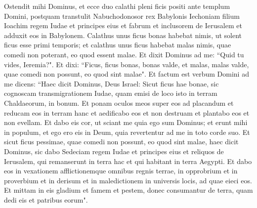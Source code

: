 \begin{biblechapter}  
\verse Ostendit mihi Dominus, et ecce duo calathi pleni ficis positi ante templum Domini, postquam transtulit Nabuchodonosor rex Babylonis Iechoniam filium Ioachim regem Iudae et principes eius et fabrum et inclusorem de Ierusalem et adduxit eos in Babylonem. 
\verse Calathus unus ficus bonas habebat nimis, ut solent ficus esse primi temporis; et calathus unus ficus habebat malas nimis, quae comedi non poterant, eo quod essent malae. 
\verse Et dixit Dominus ad me: “Quid tu vides, Ieremia?". Et dixi: “Ficus, ficus bonas, bonas valde, et malas, malas valde, quae comedi non possunt, eo quod sint malae". 
\verse Et factum est verbum Domini ad me dicens: 
\verse “Haec dicit Dominus, Deus Israel: Sicut ficus hae bonae, sic cognoscam transmigrationem Iudae, quam emisi de loco isto in terram Chaldaeorum, in bonum. 
\verse Et ponam oculos meos super eos ad placandum et reducam eos in terram hanc et aedificabo eos et non destruam et plantabo eos et non evellam. 
\verse Et dabo eis cor, ut sciant me quia ego sum Dominus; et erunt mihi in populum, et ego ero eis in Deum, quia revertentur ad me in toto corde suo. 
\verse Et sicut ficus pessimae, quae comedi non possunt, eo quod sint malae, haec dicit Dominus, sic dabo Sedeciam regem Iudae et principes eius et reliquos de Ierusalem, qui remanserunt in terra hac et qui habitant in terra Aegypti. 
\verse Et dabo eos in vexationem afflictionemque omnibus regnis terrae, in opprobrium et in proverbium et in derisum et in maledictionem in universis locis, ad quae eieci eos. 
\verse Et mittam in eis gladium et famem et pestem, donec consumantur de terra, quam dedi eis et patribus eorum". 
\end{biblechapter}

